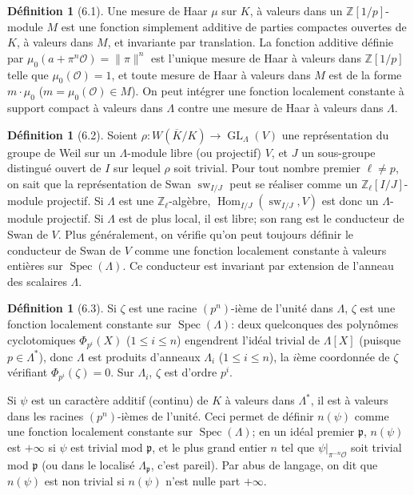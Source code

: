 \documentclass[11pt]{amsart}
\theoremstyle{plain}
\theoremstyle{definition}
\newtheorem{definition}[theorem]{D\'efinition}
\DeclareMathOperator{\Hom}{Hom}
\DeclareMathOperator{\Spec}{Spec}
\DeclareMathOperator{\GL}{GL}
\DeclareMathOperator{\sw}{sw}
\begin{document}
\begin{definition}[6.1]
Une mesure de Haar $\mu$ sur $K$, \`a valeurs dans un $\mathbb{Z}[1/p]$-module $M$ est une fonction simplement additive de parties compactes ouvertes de $K$, \`a valeurs dans $M$, et invariante par translation. La fonction additive d\'efinie par $\mu_0(a + \pi^n\mathcal{O}) = \|\pi\|^n$ est l'unique mesure de Haar \`a valeurs dans $\mathbb{Z}[1/p]$ telle que $\mu_0(\mathcal{O}) = 1$, et toute mesure de Haar \`a valeurs dans $M$ est de la forme $m \cdot \mu_0$ ($m = \mu_0(\mathcal{O}) \in M$). On peut int\'egrer une fonction localement constante \`a support compact \`a valeurs dans $\Lambda$ contre une mesure de Haar \`a valeurs dans $\Lambda$.
\end{definition}

\begin{definition}[6.2]
Soient $\rho: W(\overline{K}/K) \to \GL_\Lambda(V)$ une repr\'esentation du groupe de Weil sur un $\Lambda$-module libre (ou projectif) $V$, et $J$ un sous-groupe distingu\'e ouvert de $I$ sur lequel $\rho$ soit trivial. Pour tout nombre premier $\ell \not= p$, on sait que la repr\'esentation de Swan $\sw_{I/J}$ peut se r\'ealiser comme un $\mathbb{Z}_\ell[I/J]$-module projectif. Si $\Lambda$ est une $\mathbb{Z}_\ell$-alg\`ebre, $\Hom_{I/J}(\sw_{I/J}, V)$ est donc un $\Lambda$-module projectif. Si $\Lambda$ est de plus local, il est libre; son rang est le conducteur de Swan de $V$. Plus g\'en\'eralement, on v\'erifie qu'on peut toujours d\'efinir le conducteur de Swan de $V$ comme une fonction localement constante \`a valeurs enti\`eres sur $\Spec(\Lambda)$. Ce conducteur est invariant par extension de l'anneau des scalaires $\Lambda$.
\end{definition}

\begin{definition}[6.3]
Si $\zeta$ est une racine $(p^n)$-i\`eme de l'unit\'e dans $\Lambda$, $\zeta$ est une fonction localement constante sur $\Spec(\Lambda)$: deux quelconques des polyn\^omes cyclotomiques $\Phi_{p^i}(X)$ ($1 \leq i \leq n$) engendrent l'id\'eal trivial de $\Lambda[X]$ (puisque $p \in \Lambda^*$), donc $\Lambda$ est produits d'anneaux $\Lambda_i$ ($1 \leq i \leq n$), la $i$\`eme coordonn\'ee de $\zeta$ v\'erifiant $\Phi_{p^i}(\zeta) = 0$. Sur $\Lambda_i$, $\zeta$ est d'ordre $p^i$.

Si $\psi$ est un caract\`ere additif (continu) de $K$ \`a valeurs dans $\Lambda^*$, il est \`a valeurs dans les racines $(p^n)$-i\`emes de l'unit\'e. Ceci permet de d\'efinir $n(\psi)$ comme une fonction localement constante sur $\Spec(\Lambda)$; en un id\'eal premier $\mathfrak{p}$, $n(\psi)$ est $+\infty$ si $\psi$ est trivial mod $\mathfrak{p}$, et le plus grand entier $n$ tel que $\psi|_{\pi^{-n}\mathcal{O}}$ soit trivial mod $\mathfrak{p}$ (ou dans le localis\'e $\Lambda_{\mathfrak{p}}$, c'est pareil). Par abus de langage, on dit que $n(\psi)$ est non trivial si $n(\psi)$ n'est nulle part $+\infty$.
\end{definition}
\end{document}
